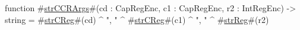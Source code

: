 function #\hyperref[sailMIPSzstrCCRArgs]{strCCRArgs}#(cd : CapRegEnc, c1 : CapRegEnc, r2 : IntRegEnc) -> string = #\hyperref[sailMIPSzstrCReg]{strCReg}#(cd) ^ ", " ^ #\hyperref[sailMIPSzstrCReg]{strCReg}#(c1) ^ ", " ^ #\hyperref[sailMIPSzstrReg]{strReg}#(r2)
